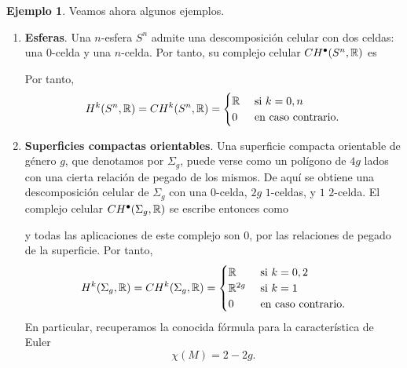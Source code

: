 \documentclass[11pt,a4paper]{amsbook}
\theoremstyle{remark} \newtheorem{rmk}[subsection]{Observación}
\theoremstyle{definition} \newtheorem{defn}[subsection]{Definición}
\theoremstyle{definition} \newtheorem{ex}[subsection]{Ejemplo}
\theoremstyle{definition} \newtheorem{ej}[subsection]{Ejercicio}
\begin{document}
\begin{ex}
  Veamos ahora algunos ejemplos.
  \begin{enumerate}
  \item \textbf{Esferas}. Una $n$-esfera $S^n$ admite una descomposición celular con dos celdas: una $0$-celda y una $n$-celda. Por tanto, su complejo celular $CH^\bullet(S^n,\mathbb R)$ es
          \begin{center}
          \end{center}
          Por tanto,
          \begin{equation*}
            H^k(S^n,\mathbb R) = CH^k(S^n,\mathbb R) =
            \begin{cases}
\mathbb R & \text{ si } k=0,n\\
0 & \text{ en caso contrario}.
\end{cases}
          \end{equation*}

  \item \textbf{Superficies compactas orientables}. Una superficie compacta orientable de género $g$, que denotamos por $\Sigma_g$, puede verse como un polígono de $4g$ lados con una cierta relación de pegado de los mismos. De aquí se obtiene una descomposición celular de $\Sigma_g$ con una $0$-celda, $2g$ $1$-celdas, y $1$ $2$-celda. El complejo celular $CH^\bullet(\Sigma_g,\mathbb R)$ se escribe entonces como
          \begin{center}
          \end{center}
          y todas las aplicaciones de este complejo son $0$, por las relaciones de pegado de la superficie. Por tanto,
          \begin{equation*}
H^k(\Sigma_g,\mathbb R) = CH^k(\Sigma_g,\mathbb R) =
            \begin{cases}
\mathbb R & \text{ si } k=0,2\\
\mathbb R^{2g} & \text{ si } k=1\\
0 & \text{ en caso contrario}.
\end{cases}
          \end{equation*}
          En particular, recuperamos la conocida fórmula para la característica de Euler
          \begin{equation*}
\chi(M) = 2-2g .
          \end{equation*}
  \end{enumerate}
\end{ex}
\end{document}
